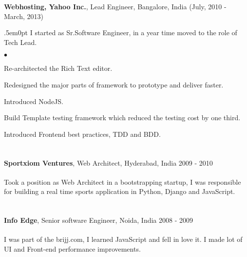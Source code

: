 \documentclass[margin, line, 10pt]{res}
\newenvironment{list2}{
  \begin{list}{$\bullet$}{%
      \setlength{\itemsep}{0in}
      \setlength{\parsep}{0in} \setlength{\parskip}{0in}
      \setlength{\topsep}{0in} \setlength{\partopsep}{0in}
      \setlength{\leftmargin}{0.2in}}}{\end{list}}
\begin{document}
\begin{resume}
{\Large {\bf Webhosting, Yahoo Inc.}}, Lead Engineer, Bangalore, India  \hfill (July, 2010 - March, 2013)\\
\vspace{-.1cm}
\begin{adjustwidth}{.5em}{0pt}
I started as Sr.Software Engineer, in a year time moved to the role of Tech Lead.\\
\vspace{-.1cm}
\begin{list2}
\vspace{-.3cm}
\item Re-architected the Rich Text editor.\\
\vspace{-.3cm}
\item Redesigned the major parts of framework to prototype and deliver faster.\\
\vspace{-.3cm}
\item Introduced NodeJS.\\
\vspace{-.3cm}
\item Build Template testing framework which reduced the testing cost by one third.\\
\vspace{-.3cm}
\item Introduced Frontend best practices, TDD and BDD.\\
\end{list2}
\vspace{.05cm}
\end{adjustwidth}

\section{}
{\Large {\bf Sportxiom Ventures}}, Web Architect, Hyderabad, India  \hfill 2009 - 2010\\
\vspace{-.3cm}\\
Took a position as Web Architect in a bootstrapping startup, I was responsible for building a real time sports application in Python, Django and JavaScript.
\vspace{.05cm}

\section{}
{\Large {\bf Info Edge}}, Senior software Engineer,  Noida, India \hfill 2008 - 2009 \\
\vspace{-.3cm}\\
I was part of the brijj.com, I learned JavaScript and fell in love it. I made lot of UI and Front-end performance improvements.
\vspace{.05cm}



\end{resume}
\end{document}
